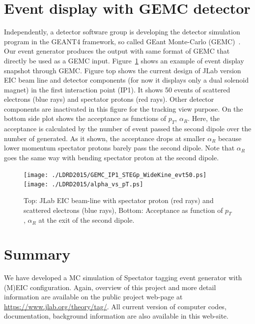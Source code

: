 \documentclass[12pt,letterpaper]{article}
\begin{document}
\section{Event display with GEMC detector}\label{GEMC_Detector}
Independently, a detector software group is developing the detector simulation program in the GEANT4 framework, so called GEant Monte-Carlo (GEMC)~\cite{EIC_GEMC}. Our event generator produces the output with same format of GEMC that directly be used as a GEMC input. Figure~\ref{fig:STEGGEMC} shows an example of event display snapshot through GEMC. Figure top shows the current design of JLab version EIC beam line and detector components (for now it displays only a dual solenoid magnet) in the first interaction point (IP1). It shows 50 events of scattered electrons (blue rays) and spectator protons (red rays). Other detector components are inactivated in this figure for the tracking view purpose. On the bottom side plot shows the acceptance as functions of $p_T$, $\alpha_R$. Here, the acceptance is calculated by  the number of event passed the second dipole over the number of generated. As it shown, the acceptance drops at smaller $\alpha_R$ because lower momentum spectator protons barely pass the second dipole. Note that $\alpha_R$ goes the same way with bending spectator proton at the second dipole.
\begin{figure}
\begin{center}
    \texttt{[image: ./LDRD2015/GEMC\_IP1\_STEGp\_WideKine\_evt50.ps]}\\
    \texttt{[image: ./LDRD2015/alpha\_vs\_pT.ps]}
    \caption[STEG event with GEMC]{Top: JLab EIC beam-line with spectator proton (red rays) and scattered electrons (blue rays), Bottom: Acceptance as function of $p_T$, $\alpha_R$ at the exit of the second dipole. 
    \label{fig:STEGGEMC}
        }
\end{center}
\end{figure}






\section{Summary}
 We have developed a MC simulation of Spectator tagging event generator with (M)EIC configuration. 
Again, overview of this project and more detail information are available on the public project web-page at \url{https://www.jlab.org/theory/tag/}. All current version of computer codes, documentation, background information are also available in this web-site.
\end{document}
